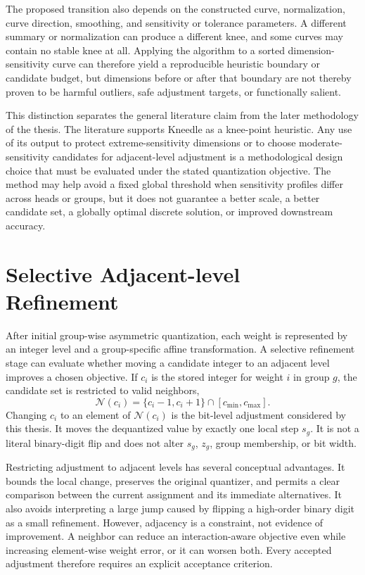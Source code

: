 The proposed transition also depends on the constructed curve, normalization, curve direction, smoothing, and sensitivity or tolerance parameters. A different summary or normalization can produce a different knee, and some curves may contain no stable knee at all. Applying the algorithm to a sorted dimension-sensitivity curve can therefore yield a reproducible heuristic boundary or candidate budget, but dimensions before or after that boundary are not thereby proven to be harmful outliers, safe adjustment targets, or functionally salient.

This distinction separates the general literature claim from the later methodology of the thesis. The literature supports Kneedle as a knee-point heuristic. Any use of its output to protect extreme-sensitivity dimensions or to choose moderate-sensitivity candidates for adjacent-level adjustment is a methodological design choice that must be evaluated under the stated quantization objective. The method may help avoid a fixed global threshold when sensitivity profiles differ across heads or groups, but it does not guarantee a better scale, a better candidate set, a globally optimal discrete solution, or improved downstream accuracy.

\section{Selective Adjacent-level Refinement}

After initial group-wise asymmetric quantization, each weight is represented by an integer level and a group-specific affine transformation. A selective refinement stage can evaluate whether moving a candidate integer to an adjacent level improves a chosen objective. If $c_i$ is the stored integer for weight $i$ in group $g$, the candidate set is restricted to valid neighbors,
\begin{equation}
\mathcal{N}(c_i)=
\{c_i-1,c_i+1\}
\cap[c_{\min},c_{\max}].
\end{equation}
Changing $c_i$ to an element of $\mathcal{N}(c_i)$ is the bit-level adjustment considered by this thesis. It moves the dequantized value by exactly one local step $s_g$. It is not a literal binary-digit flip and does not alter $s_g$, $z_g$, group membership, or bit width.

Restricting adjustment to adjacent levels has several conceptual advantages. It bounds the local change, preserves the original quantizer, and permits a clear comparison between the current assignment and its immediate alternatives. It also avoids interpreting a large jump caused by flipping a high-order binary digit as a small refinement. However, adjacency is a constraint, not evidence of improvement. A neighbor can reduce an interaction-aware objective even while increasing element-wise weight error, or it can worsen both. Every accepted adjustment therefore requires an explicit acceptance criterion.

